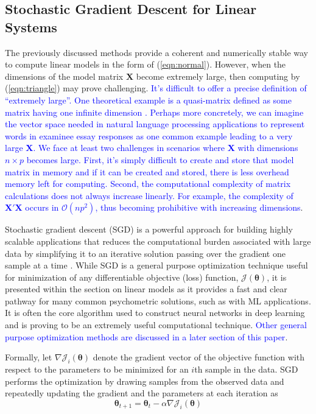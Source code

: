 \documentclass[12pt]{article}
\begin{document}
\subsection*{Stochastic Gradient Descent for Linear Systems}

The previously discussed methods provide a coherent and numerically stable way to compute linear models in the form of (\ref{eqn:normal}). However, when the dimensions of the model matrix $\bm{X}$ become extremely large, then computing by (\ref{eqn:triangle}) may prove challenging. \textcolor{blue}{It's difficult to offer a precise definition of ``extremely large''. One theoretical example is a quasi-matrix defined as some matrix having one infinite dimension \cite{quasi-matrix}. Perhaps more concretely, we can imagine the vector space needed in natural language processing applications to represent words in examinee essay responses as one common example leading to a very large $\bm{X}$. We face at least two challenges in scenarios where $\bm{X}$ with dimensions $n \times p$ becomes large. First, it's simply difficult to create and store that model matrix in memory and if it can be created and stored, there is less overhead memory left for computing. Second, the computational complexity of matrix calculations does not always increase linearly. For example, the complexity of $\bm{X'X}$ occurs in $\mathcal{O}(np^2)$, thus becoming prohibitive with increasing dimensions}.

Stochastic gradient descent (SGD) is a powerful approach for building highly scalable applications that reduces the computational burden associated with large data by simplifying it to an iterative solution passing over the gradient one sample at a time \cite{cizek,shamir,tran}. While SGD is a general purpose optimization technique useful for minimization of any differentiable objective (loss) function, $\mathcal{J}(\bm{\theta})$, it is presented within the section on linear models as it provides a fast and clear pathway for many common psychometric solutions, such as with ML applications. It is often the core algorithm used to construct neural networks in deep learning and is proving to be an extremely useful computational technique. \textcolor{blue}{Other general purpose optimization methods are discussed in a later section of this paper}. 

Formally, let $\nabla\mathcal{J}_i(\bm{\theta})$ denote the gradient vector of the objective function with respect to the parameters to be minimized for an $i$th sample in the data. SGD performs the optimization by drawing samples from the observed data and repeatedly updating the gradient and the parameters at each iteration as
\begin{equation}
\label{eqn:sgd}
\bm{\theta}_{t+1} = \bm{\theta}_t - \alpha \nabla\mathcal{J}_i(\bm{\theta})
\end{equation}
\end{document}
